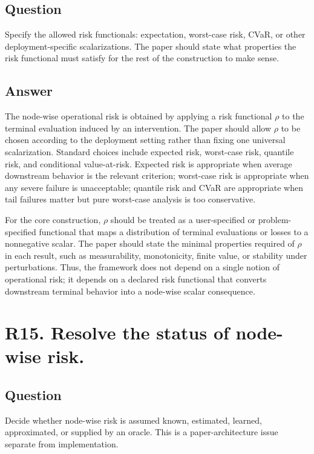 \documentclass[11pt,a4paper]{article}
\begin{document}
\subsection*{Question}

Specify the allowed risk functionals: expectation, worst-case risk, CVaR, or other deployment-specific scalarizations. The paper should state what properties the risk functional must satisfy for the rest of the construction to make sense.

\subsection*{Answer}

The node-wise operational risk is obtained by applying a risk functional \(\rho\) to the terminal evaluation induced by an intervention. The paper should allow \(\rho\) to be chosen according to the deployment setting rather than fixing one universal scalarization. Standard choices include expected risk, worst-case risk, quantile risk, and conditional value-at-risk. Expected risk is appropriate when average downstream behavior is the relevant criterion; worst-case risk is appropriate when any severe failure is unacceptable; quantile risk and CVaR are appropriate when tail failures matter but pure worst-case analysis is too conservative.

For the core construction, \(\rho\) should be treated as a user-specified or problem-specified functional that maps a distribution of terminal evaluations or losses to a nonnegative scalar. The paper should state the minimal properties required of \(\rho\) in each result, such as measurability, monotonicity, finite value, or stability under perturbations. Thus, the framework does not depend on a single notion of operational risk; it depends on a declared risk functional that converts downstream terminal behavior into a node-wise scalar consequence.

\section*{R15. Resolve the status of node-wise risk.}

\subsection*{Question}

Decide whether node-wise risk is assumed known, estimated, learned, approximated, or supplied by an oracle. This is a paper-architecture issue separate from implementation.
\end{document}
